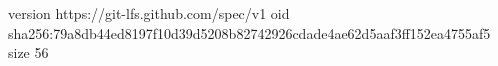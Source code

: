 version https://git-lfs.github.com/spec/v1
oid sha256:79a8db44ed8197f10d39d5208b82742926cdade4ae62d5aaf3ff152ea4755af5
size 56

